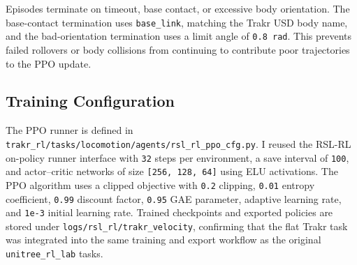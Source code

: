 Episodes terminate on timeout, base contact, or excessive body orientation. The base-contact termination
uses \texttt{base\_link}, matching the Trakr USD body name, and the bad-orientation termination uses a
limit angle of \texttt{0.8 rad}. This prevents failed rollovers or body collisions from continuing to
contribute poor trajectories to the PPO update.

\subsection{Training Configuration}

The PPO runner is defined in
\texttt{trakr\_rl/tasks/locomotion/agents/rsl\_rl\_ppo\_cfg.py}. I reused the RSL-RL on-policy runner
interface with \texttt{32} steps per environment, a save interval of \texttt{100}, and actor--critic
networks of size \texttt{[256, 128, 64]} using ELU activations. The PPO algorithm uses a clipped objective
with \texttt{0.2} clipping, \texttt{0.01} entropy coefficient, \texttt{0.99} discount factor,
\texttt{0.95} GAE parameter, adaptive learning rate, and \texttt{1e-3} initial learning rate. Trained
checkpoints and exported policies are stored under \texttt{logs/rsl\_rl/trakr\_velocity}, confirming that
the flat Trakr task was integrated into the same training and export workflow as the original
\texttt{unitree\_rl\_lab} tasks.

